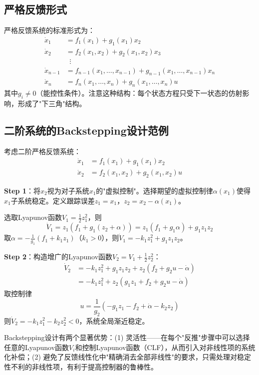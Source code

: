\subsection{严格反馈形式}

严格反馈系统的标准形式为：
\begin{align*}
\dot{x}_1 &= f_1(x_1) + g_1(x_1)x_2 \\
\dot{x}_2 &= f_2(x_1, x_2) + g_2(x_1, x_2)x_3 \\
&\;\;\vdots \\
\dot{x}_{n-1} &= f_{n-1}(x_1, \dots, x_{n-1}) + g_{n-1}(x_1, \dots, x_{n-1})x_n \\
\dot{x}_n &= f_n(x_1, \dots, x_n) + g_n(x_1, \dots, x_n)u
\end{align*}
其中$g_i \neq 0$（能控性条件）。注意这种结构：每个状态方程只受下一状态的仿射影响，形成了"下三角"结构。

\subsection{二阶系统的Backstepping设计范例}

考虑二阶严格反馈系统：
\begin{align*}
\dot{x}_1 &= f_1(x_1) + g_1(x_1)x_2 \\
\dot{x}_2 &= f_2(x_1, x_2) + g_2(x_1, x_2)u
\end{align*}

\textbf{Step 1}：将$x_2$视为对子系统$x_1$的"虚拟控制"。选择期望的虚拟控制律$\alpha(x_1)$使得$x_1$子系统稳定。定义跟踪误差$z_1 = x_1$，$z_2 = x_2 - \alpha(x_1)$。

选取Lyapunov函数$V_1 = \frac{1}{2}z_1^2$，则
\[
\dot{V}_1 = z_1(f_1 + g_1(z_2 + \alpha)) = z_1(f_1 + g_1\alpha) + g_1 z_1 z_2
\]
取$\alpha = -\frac{1}{g_1}(f_1 + k_1 z_1)$（$k_1 > 0$），则$\dot{V}_1 = -k_1 z_1^2 + g_1 z_1 z_2$。

\textbf{Step 2}：构造增广的Lyapunov函数$V_2 = V_1 + \frac{1}{2}z_2^2$：
\begin{align*}
\dot{V}_2 &= -k_1 z_1^2 + g_1 z_1 z_2 + z_2(f_2 + g_2 u - \dot{\alpha}) \\
&= -k_1 z_1^2 + z_2(g_1 z_1 + f_2 + g_2 u - \dot{\alpha})
\end{align*}
取控制律
\[
u = \frac{1}{g_2}(-g_1 z_1 - f_2 + \dot{\alpha} - k_2 z_2)
\]
则$\dot{V}_2 = -k_1 z_1^2 - k_2 z_2^2 < 0$，系统全局渐近稳定。

\begin{remark}
Backstepping设计有两个显著优势：(1) 灵活性——在每个"反推"步骤中可以选择任意的Lyapunov函数$V_i$和控制Lyapunov函数（CLF），从而引入对非线性项的系统化补偿；(2) 避免了反馈线性化中"精确消去全部非线性"的要求，只需处理对稳定性不利的非线性项，有利于提高控制器的鲁棒性。
\end{remark}


